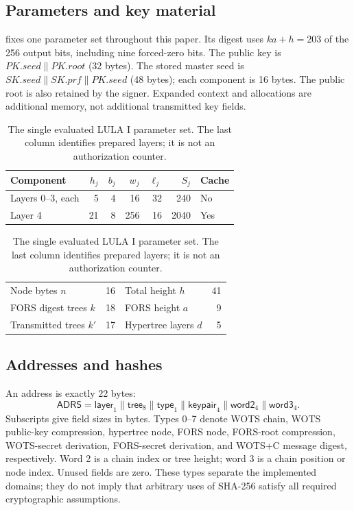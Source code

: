 \documentclass[a4paper,envcountsame,runningheads]{llncs}
\newcommand{\AD}{\mathsf{ADRS}}
\begin{document}
\subsection{Parameters and key material}
 fixes one parameter set throughout this paper. Its digest uses $ka+h=203$ of the 256 output bits, including nine forced-zero bits. The public key is $PK.seed\|PK.root$ (32 bytes). The stored master seed is $SK.seed\|SK.prf\|PK.seed$ (48 bytes); each component is 16 bytes. The public root is also retained by the signer. Expanded context and allocations are additional memory, not additional transmitted key fields.

\begin{table}[t]
\caption{The single evaluated LULA I parameter set. The last column identifies prepared layers; it is not an authorization counter.}\label{tab:params}
\centering\small
\begin{tabular}{lrrrrrl}\toprule
Component & $h_j$ & $b_j$ & $w_j$ & $\ell_j$ & $S_j$ & Cache\\\midrule
Layers 0--3, each &5&4&16&32&240&No\\
Layer 4 &21&8&256&16&2040&Yes\\\bottomrule
\end{tabular}

\smallskip
\begin{tabular}{lr@{\quad}lr}\toprule
Node bytes $n$&16&Total height $h$&41\\
FORS digest trees $k$&18&FORS height $a$&9\\
Transmitted trees $k'$&17&Hypertree layers $d$&5\\\bottomrule
\end{tabular}
\end{table}

\subsection{Addresses and hashes}\label{sec:hash}
An address is exactly 22 bytes:
\[
 \AD=\mathsf{layer}_1\|\mathsf{tree}_8\|\mathsf{type}_1
       \|\mathsf{keypair}_4\|\mathsf{word2}_4\|\mathsf{word3}_4.
\]
Subscripts give field sizes in bytes. Types 0--7 denote WOTS chain, WOTS public-key compression, hypertree node, FORS node, FORS-root compression, WOTS-secret derivation, FORS-secret derivation, and WOTS+C message digest, respectively. Word 2 is a chain index or tree height; word 3 is a chain position or node index. Unused fields are zero. These types separate the implemented domains; they do not imply that arbitrary uses of SHA-256 satisfy all required cryptographic assumptions.
\end{document}
